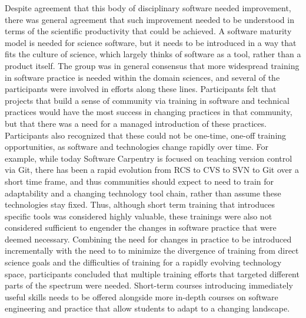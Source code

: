 \documentclass[11pt, oneside]{amsart}
\begin{document}
Despite agreement that this body of disciplinary software needed improvement, there was general agreement that
such improvement needed to be understood in terms of the scientific productivity that could be achieved. A
software maturity model is needed for science software, but it needs to be introduced in a way that fits
the culture of science, which largely thinks of software as a tool, rather than a product itself.
The group was in general consensus that more widespread training in software practice is needed within the
domain sciences, and several of the participants were involved in efforts along these lines.  Participants felt
that projects that build a sense of community via training in software and technical practices would have the
most success in changing practices in that community, but that there was a need for a managed introduction of
these practices. Participants also recognized that these could not be one-time, one-off training opportunities,
as software and technologies change rapidly over time.  For example, while today Software Carpentry is focused
on teaching version control via Git, there has been a rapid evolution from RCS to CVS to SVN to Git over a short
time frame, and thus communities should expect to need to train for adaptability and a changing technology tool
chain, rather than assume these technologies stay fixed.  Thus, although short term training that introduces
specific tools was considered highly valuable, these trainings were also not considered sufficient to engender the changes
in software practice that were deemed necessary.  Combining the need for changes in practice to be introduced
incrementally with the need to to minimize the divergence of training from direct science goals and the
difficulties of training for a rapidly evolving technology space, participants concluded that multiple training
efforts that targeted different parts of the spectrum were needed.  Short-term courses introducing immediately
useful skills needs to be offered alongside more in-depth courses on software engineering and practice that allow
students to adapt to a changing landscape.
\end{document}
